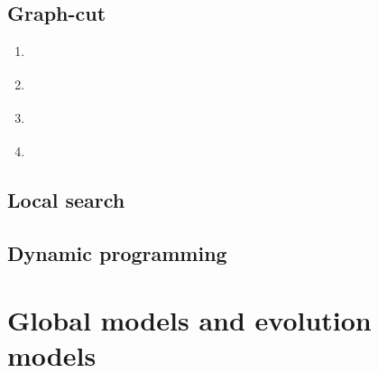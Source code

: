 \subsection{Graph-cut}	
	\begin{enumerate}
		\item{ \cite{kolmogorov04} }
		\item{ \cite{boykov01a} }
		\item{ \cite{boykov03} }
		\item{ \cite{boykov01b}	}
	\end{enumerate}
	
\subsection{Local search}	
	
\subsection{Dynamic programming}	

\section{Global models and evolution models}
